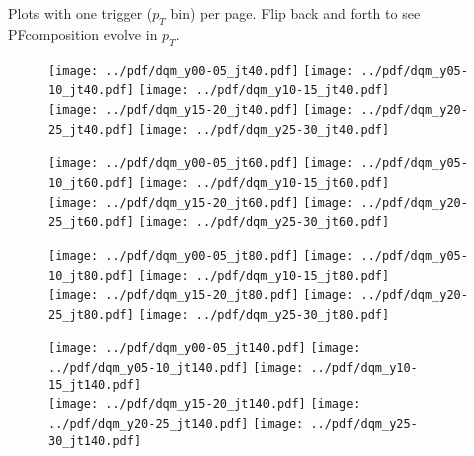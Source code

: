 \documentclass[landscape,10pt]{beamer} %
\begin{document}
Plots with one trigger ($p_T$ bin) per page. Flip back and forth to see PFcomposition evolve in $p_T$.

\newpage

\begin{figure}[p]
\centering
\texttt{[image: ../pdf/dqm\_y00-05\_jt40.pdf]}
\texttt{[image: ../pdf/dqm\_y05-10\_jt40.pdf]}
\texttt{[image: ../pdf/dqm\_y10-15\_jt40.pdf]}\\
\texttt{[image: ../pdf/dqm\_y15-20\_jt40.pdf]}
\texttt{[image: ../pdf/dqm\_y20-25\_jt40.pdf]}
\texttt{[image: ../pdf/dqm\_y25-30\_jt40.pdf]}
\end{figure}

\newpage

\begin{figure}[p]
\centering
\texttt{[image: ../pdf/dqm\_y00-05\_jt60.pdf]}
\texttt{[image: ../pdf/dqm\_y05-10\_jt60.pdf]}
\texttt{[image: ../pdf/dqm\_y10-15\_jt60.pdf]}\\
\texttt{[image: ../pdf/dqm\_y15-20\_jt60.pdf]}
\texttt{[image: ../pdf/dqm\_y20-25\_jt60.pdf]}
\texttt{[image: ../pdf/dqm\_y25-30\_jt60.pdf]}
\end{figure}

\newpage

\begin{figure}[p]
\centering
\texttt{[image: ../pdf/dqm\_y00-05\_jt80.pdf]}
\texttt{[image: ../pdf/dqm\_y05-10\_jt80.pdf]}
\texttt{[image: ../pdf/dqm\_y10-15\_jt80.pdf]}\\
\texttt{[image: ../pdf/dqm\_y15-20\_jt80.pdf]}
\texttt{[image: ../pdf/dqm\_y20-25\_jt80.pdf]}
\texttt{[image: ../pdf/dqm\_y25-30\_jt80.pdf]}
\end{figure}

\newpage

\begin{figure}[p]
\centering
\texttt{[image: ../pdf/dqm\_y00-05\_jt140.pdf]}
\texttt{[image: ../pdf/dqm\_y05-10\_jt140.pdf]}
\texttt{[image: ../pdf/dqm\_y10-15\_jt140.pdf]}\\
\texttt{[image: ../pdf/dqm\_y15-20\_jt140.pdf]}
\texttt{[image: ../pdf/dqm\_y20-25\_jt140.pdf]}
\texttt{[image: ../pdf/dqm\_y25-30\_jt140.pdf]}
\end{figure}
\end{document}
